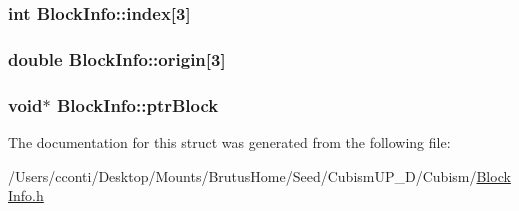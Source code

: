 \subsubsection[{index}]{\setlength{\rightskip}{0pt plus 5cm}int Block\+Info\+::index\mbox{[}3\mbox{]}}\label{struct_block_info_ad32832aaa2dee35464a74abfae741572}
\hypertarget{struct_block_info_a8d2d03097cfbffc58d3cc2dee371e4b2}{}
\subsubsection[{origin}]{\setlength{\rightskip}{0pt plus 5cm}double Block\+Info\+::origin\mbox{[}3\mbox{]}}\label{struct_block_info_a8d2d03097cfbffc58d3cc2dee371e4b2}
\hypertarget{struct_block_info_af3655416c17becfb24a9f475a7b97d23}{}
\subsubsection[{ptr\+Block}]{\setlength{\rightskip}{0pt plus 5cm}void$\ast$ Block\+Info\+::ptr\+Block}\label{struct_block_info_af3655416c17becfb24a9f475a7b97d23}


The documentation for this struct was generated from the following file\+:\begin{DoxyCompactItemize}
\item 
/\+Users/cconti/\+Desktop/\+Mounts/\+Brutus\+Home/\+Seed/\+Cubism\+U\+P\+\_\+D/\+Cubism/\hyperlink{_block_info_8h}{Block\+Info.\+h}\end{DoxyCompactItemize}
